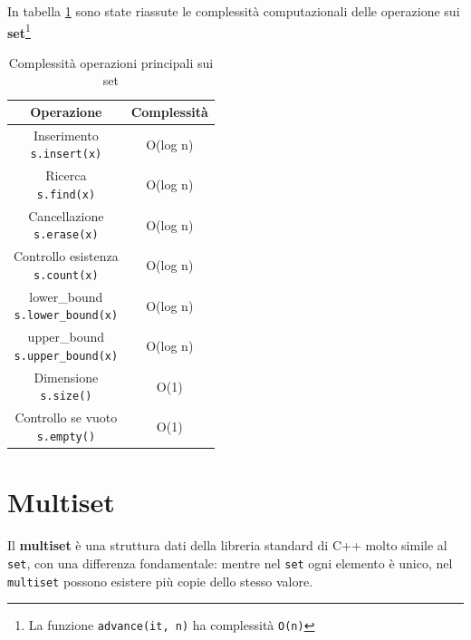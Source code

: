 In tabella \ref{tab:strutture-dati:set:complessita} sono state riassute le complessità computazionali delle operazione sui \textbf{set}\footnote{La funzione \texttt{advance(it, n)} ha complessità \texttt{O(n)}}

\begin{table}[h!]
	\centering
	\renewcommand{\arraystretch}{1.5}
	\setlength{\tabcolsep}{12pt}
	\begin{tabular}{|c|c|}
		\hline
		\textbf{Operazione} & \textbf{Complessità} \\
		\hline
		\makecell{Inserimento \\ \texttt{s.insert(x)}} & O(log n) \\
		\hline
		\makecell{Ricerca \\ \texttt{s.find(x)}} & O(log n) \\
		\hline
		\makecell{Cancellazione \\ \texttt{s.erase(x)}} & O(log n) \\
		\hline
		\makecell{Controllo esistenza \\ \texttt{s.count(x)}} & O(log n) \\
		\hline
		\makecell{lower\_bound \\ \texttt{s.lower\_bound(x)}} & O(log n) \\
		\hline
		\makecell{upper\_bound \\ \texttt{s.upper\_bound(x)}} & O(log n) \\
		\hline
		\makecell{Dimensione \\ \texttt{s.size()}} & O(1) \\
		\hline
		\makecell{Controllo se vuoto \\ \texttt{s.empty()}} & O(1) \\
		\hline
	\end{tabular}
	\caption{Complessità operazioni principali sui set}
	\label{tab:strutture-dati:set:complessita}
	
\end{table}




\newpage
\section{Multiset}


Il \textbf{multiset} è una struttura dati della libreria standard di C++ molto simile al \texttt{set}, con una differenza fondamentale: 
mentre nel \texttt{set} ogni elemento è unico, nel \texttt{multiset} possono esistere più copie dello stesso valore.

